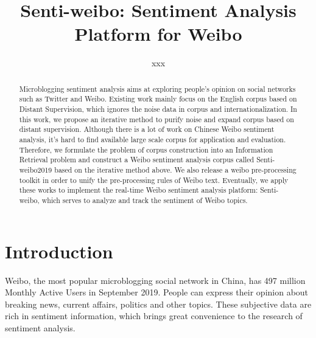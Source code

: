 \documentclass[runningheads]{llncs}
\begin{document}
%
\title{Senti-weibo: Sentiment Analysis Platform for Weibo}
%
\author{xxx}
%
%
%
\maketitle              %
%
\begin{abstract}
Microblogging sentiment analysis aims at exploring people's opinion on social networks such as Twitter and Weibo. Existing work mainly focus on the English corpus based on Distant Supervision, which ignores the noise data in corpus and internationalization. In this work, we propose an iterative method to purify noise and expand corpus based on distant supervision. Although there is a lot of work on Chinese Weibo sentiment analysis, it's hard to find available large scale corpus for application and evaluation. Therefore, we formulate the problem of corpus construction into an Information Retrieval problem and construct a Weibo sentiment analysis corpus called Senti-weibo2019 based on the iterative method above. We also release a weibo pre-processing toolkit in order to unify the pre-processing rules of Weibo text. Eventually, we apply these works to implement the real-time Weibo sentiment analysis platform: Senti-weibo, which serves to analyze and track the sentiment of Weibo topics.


\end{abstract}

\section{Introduction}
Weibo, the most popular microblogging social network in China, has 497 million Monthly Active Users in September 2019. People can express their opinion about breaking news, current affairs, politics and other topics. These subjective data are rich in sentiment information, which brings great convenience to the research of sentiment analysis.
\end{document}
